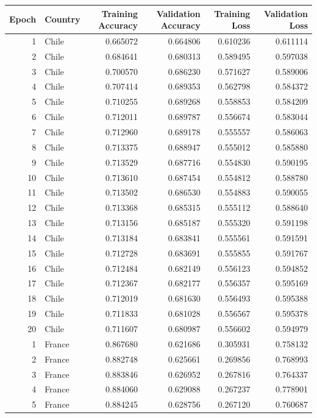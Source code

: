 \begin{tabular}{rlrrrr}
\toprule
Epoch & Country & Training Accuracy & Validation Accuracy & Training Loss & Validation Loss \\
\midrule
1 & Chile & 0.665072 & 0.664806 & 0.610236 & 0.611114 \\
2 & Chile & 0.684641 & 0.680313 & 0.589495 & 0.597038 \\
3 & Chile & 0.700570 & 0.686230 & 0.571627 & 0.589006 \\
4 & Chile & 0.707414 & 0.689353 & 0.562798 & 0.584372 \\
5 & Chile & 0.710255 & 0.689268 & 0.558853 & 0.584209 \\
6 & Chile & 0.712011 & 0.689787 & 0.556674 & 0.583044 \\
7 & Chile & 0.712960 & 0.689178 & 0.555557 & 0.586063 \\
8 & Chile & 0.713375 & 0.688947 & 0.555012 & 0.585880 \\
9 & Chile & 0.713529 & 0.687716 & 0.554830 & 0.590195 \\
10 & Chile & 0.713610 & 0.687454 & 0.554812 & 0.588780 \\
11 & Chile & 0.713502 & 0.686530 & 0.554883 & 0.590055 \\
12 & Chile & 0.713368 & 0.685315 & 0.555112 & 0.588640 \\
13 & Chile & 0.713156 & 0.685187 & 0.555320 & 0.591198 \\
14 & Chile & 0.713184 & 0.683841 & 0.555561 & 0.591591 \\
15 & Chile & 0.712728 & 0.683691 & 0.555855 & 0.591767 \\
16 & Chile & 0.712484 & 0.682149 & 0.556123 & 0.594852 \\
17 & Chile & 0.712367 & 0.682177 & 0.556357 & 0.595169 \\
18 & Chile & 0.712019 & 0.681630 & 0.556493 & 0.595388 \\
19 & Chile & 0.711833 & 0.681028 & 0.556567 & 0.595378 \\
20 & Chile & 0.711607 & 0.680987 & 0.556602 & 0.594979 \\
1 & France & 0.867680 & 0.621686 & 0.305931 & 0.758132 \\
2 & France & 0.882748 & 0.625661 & 0.269856 & 0.768993 \\
3 & France & 0.883846 & 0.626952 & 0.267816 & 0.764337 \\
4 & France & 0.884060 & 0.629088 & 0.267237 & 0.778901 \\
5 & France & 0.884245 & 0.628756 & 0.267120 & 0.760687 \\

\end{tabular}

